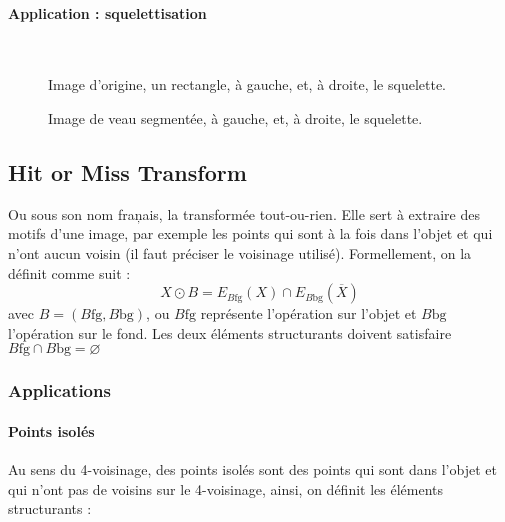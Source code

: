 \documentclass[10pt,a4paper]{article}
\begin{document}
\paragraph{Application : squelettisation} ~~~
\begin{figure}[h!]
\hspace{-0.2\textwidth}
\vspace{-40mm}
	\caption{Image d'origine, un rectangle, \`{a} gauche, et, \`{a} droite, le squelette.}
	\label{rectSkel}
\end{figure}
\begin{figure}[h]
\hspace{-0.2\textwidth}
\vspace{-40mm}
	\caption{Image de veau segment\'{e}e, \`{a} gauche, et, \`{a} droite, le squelette.}
	\label{rectSkel}
\end{figure}

\clearpage

\subsection{Hit or Miss Transform}

Ou sous son nom fran\c{}ais, la transform\'{e}e tout-ou-rien. Elle sert \`{a} extraire des motifs d'une image, par exemple les points qui sont \`{a} la fois dans l'objet et qui n'ont aucun voisin (il faut pr\'{e}ciser le voisinage utilis\'{e}). Formellement, on la d\'{e}finit comme suit : 
\begin{displaymath}
	X\odot B = E_{B{\text{fg}}}\left(X\right) \cap E_{B{\text{bg}}}\left(\overline{X}\right)
\end{displaymath}
avec $B = \left(B{\text{fg}},B{\text{bg}}\right)$, ou $B{\text{fg}}$ repr\'{e}sente l'op\'{e}ration sur l'objet et $B{\text{bg}}$ l'op\'{e}ration sur le fond. Les deux \'{e}l\'{e}ments structurants doivent satisfaire $B{\text{fg}}\cap B{\text{bg}} = \varnothing$

\subsubsection{Applications}

\paragraph{Points isol\'{e}s}
Au sens du 4-voisinage, des points isol\'{e}s sont des points qui sont dans l’objet et qui n'ont pas de voisins sur le 4-voisinage, ainsi, on d\'{e}finit les \'{e}l\'{e}ments structurants : 
\end{document}
